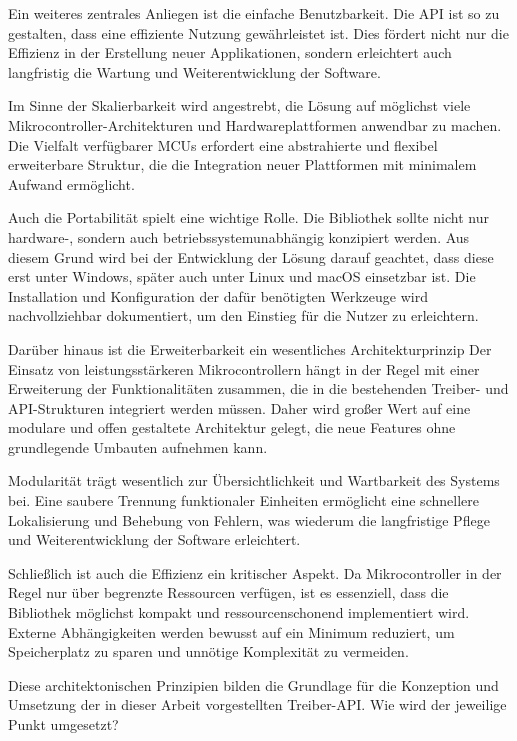 Ein weiteres zentrales Anliegen ist die einfache Benutzbarkeit. 
Die API ist so zu gestalten, dass eine effiziente Nutzung gewährleistet ist. 
Dies fördert nicht nur die Effizienz in der Erstellung neuer Applikationen, sondern erleichtert auch langfristig die Wartung und Weiterentwicklung der Software.

Im Sinne der Skalierbarkeit wird angestrebt, die Lösung auf möglichst viele Mikrocontroller-Architekturen und Hardwareplattformen anwendbar zu machen.
Die Vielfalt verfügbarer MCUs erfordert eine abstrahierte und flexibel erweiterbare Struktur, die die Integration neuer Plattformen mit minimalem Aufwand ermöglicht.

Auch die Portabilität spielt eine wichtige Rolle.
Die Bibliothek sollte nicht nur hardware-, sondern auch betriebssystemunabhängig konzipiert werden.
Aus diesem Grund wird bei der Entwicklung der Lösung darauf geachtet, dass diese erst unter Windows, später auch unter Linux und macOS einsetzbar ist.
Die Installation und Konfiguration der dafür benötigten Werkzeuge wird nachvollziehbar dokumentiert, um den Einstieg für die Nutzer zu erleichtern.

Darüber hinaus ist die Erweiterbarkeit ein wesentliches Architekturprinzip
Der Einsatz von leistungsstärkeren Mikrocontrollern hängt in der Regel mit einer Erweiterung der Funktionalitäten zusammen, die in die bestehenden Treiber- und API-Strukturen integriert werden müssen.
Daher wird großer Wert auf eine modulare und offen gestaltete Architektur gelegt, die neue Features ohne grundlegende Umbauten aufnehmen kann.

Modularität trägt wesentlich zur Übersichtlichkeit und Wartbarkeit des Systems bei. 
Eine saubere Trennung funktionaler Einheiten ermöglicht eine schnellere Lokalisierung und Behebung von Fehlern, was wiederum die langfristige Pflege und Weiterentwicklung der Software erleichtert.

Schließlich ist auch die Effizienz ein kritischer Aspekt.
Da Mikrocontroller in der Regel nur über begrenzte Ressourcen verfügen, ist es essenziell, dass die Bibliothek möglichst kompakt und ressourcenschonend implementiert wird. 
Externe Abhängigkeiten werden bewusst auf ein Minimum reduziert, um Speicherplatz zu sparen und unnötige Komplexität zu vermeiden.

Diese architektonischen Prinzipien bilden die Grundlage für die Konzeption und Umsetzung der in dieser Arbeit vorgestellten Treiber-API.
Wie wird der jeweilige Punkt umgesetzt?

